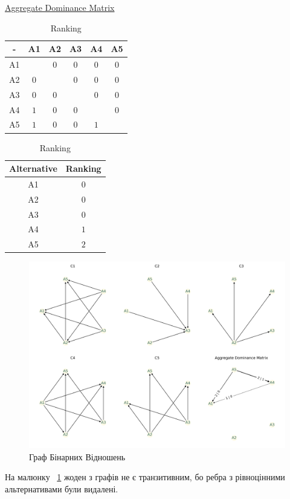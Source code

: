 \begin{table}[!ht]
    \parbox{0.49\textwidth}{
        \centering
        \caption{
            \hyperref
            [eq:dominance]
            {Aggregate Dominance Matrix}
        }
        \label{tab:adm}

        \begin{tabular}{|c|c|c|c|c|c|}
            \toprule
            -  & A1  & A2  & A3  & A4  & A5  \\

            \midrule
            A1 &     & $0$ & $0$ & $0$ & $0$ \\
            A2 & $0$ &     & $0$ & $0$ & $0$ \\
            A3 & $0$ & $0$ &     & $0$ & $0$ \\
            A4 & $1$ & $0$ & $0$ &     & $0$ \\
            A5 & $1$ & $0$ & $0$ & $1$ &     \\

            \bottomrule
        \end{tabular}
    }
    \hfill
    \parbox{0.49\textwidth}{
        \centering
        \caption{Ranking}
        \label{tab:ranking}

        \begin{tabular}{|c|c|}
            \toprule
            Alternative & Ranking \\

            \midrule
            A1          & $0$     \\
            A2          & $0$     \\
            A3          & $0$     \\
            A4          & $1$     \\
            A5          & $2$     \\

            \bottomrule
        \end{tabular}
    }
\end{table}

\newpage

\begin{figure}[!ht]
    \centering
    \includegraphics[width=\textwidth]{./images/graph}
    \caption{Граф Бінарних Відношень}
    \label{fig:graph}
\end{figure}

\begin{large}
    На малюнку ~\ref{fig:graph} жоден з графів не є транзитивним,
    бо ребра з рівноцінними альтернативами були видалені.
\end{large}
